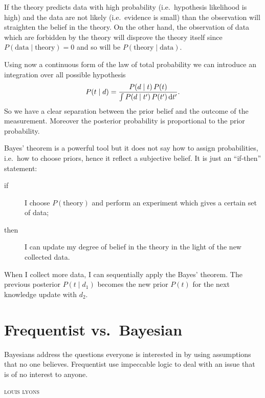 If the theory predicts data with high probability (i.e.~hypothesis likelihood is high) and the data are not likely (i.e.~evidence is small) than the observation will straighten the belief in the theory.
On the other hand, the observation of data which are forbidden by the theory will disprove the theory itself since $P(\text{data}\mid \text{theory}) = 0$ and so will be $P(\text{theory}\mid\text{data})$.


Using now a continuous form of the law of total probability we can introduce an integration over all possible hypothesis
\begin{equation}
	P(t\mid d) = \frac{P(d\mid t)\,P(t)}{\int P(d\mid t')\,P(t')\mathop{}\!\mathrm{d} t'}.
\end{equation}
So we have a clear separation between the prior belief and the outcome of the measurement.
Moreover the posterior probability is proportional to the prior probability.


Bayes' theorem is a powerful tool but it does not say how to assign probabilities, i.e.~how to choose priors, hence it reflect a subjective belief.
It is just an ``if-then'' statement:
\begin{description}
	\item[if]
		I choose $P(\text{theory})$ and perform an experiment which gives a certain set of data;
	\item[then]
		I can update my degree of belief in the theory in the light of the new collected data.
\end{description}


When I collect more data, I can sequentially apply the Bayes' theorem.
The previous posterior $P(t\mid d_1)$ becomes the new prior $P(t)$ for the next knowledge update with $d_2$.


\section{Frequentist vs.~Bayesian}

{
	\epigraph{%
		Bayesians address the questions everyone is interested in by using assumptions that no one believes.
		Frequentist use impeccable logic  to deal with an issue that is of no interest to anyone.
	}{\footnotesize%
		\textsc{louis lyons}%
	}
}


